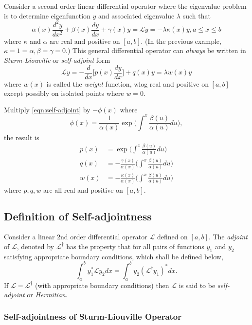 \documentclass[a4paper]{article}
\renewcommand*{\L}{\mathcal{L}}
\begin{document}
Consider a second order linear differential operator where the eigenvalue problem is to determine eigenfunction \(y\) and associated eigenvalue \(\lambda\) such that
\begin{equation}
  \label{eqn:self-adjoint}
\alpha(x) \frac{d^2y}{dx^2} + \beta(x) \frac{dy}{dx} + \gamma(x) y = \L y = -\lambda \kappa(x) y, a \leq x\leq b
\tag{\(\ast\)}
\end{equation}
where \(\kappa\) and \(\alpha\) are real and positive on \([a,b]\). (In the previous example, \(\kappa = 1 = \alpha, \beta=\gamma=0\).) This general differential operator can \emph{always} be written in \emph{Sturm-Liouville} or \emph{self-adjoint} form
\[
\L y = - \frac{d}{dx} \Big[ p(x) \frac{dy}{dx} \Big] + q(x) y =\lambda w(x) y
\]
where \(w(x)\) is called the \emph{weight} function, wlog real and positive on \([a,b]\) except possibly on isolated points where \(w=0\).

Multiply \eqref{eqn:self-adjoint} by \(-\phi(x)\) where
\[
\phi(x) = \frac{1}{\alpha(x)}\exp \Big(\int_{ }^{x} \frac{\beta(u)}{\alpha(u)} du \Big),
\]
the result is
\begin{align*}
  p(x) &= \exp \Big( \int^x \frac{\beta(u)}{\alpha(u)}du \Big) \\
  q(x) &= -\frac{\gamma(x)}{\alpha(x)} \Big( \int^x \frac{\beta(u)}{\alpha(u)}du \Big) \\
  w(x) &= -\frac{\kappa(x)}{\alpha(x)} \Big( \int^x \frac{\beta(u)}{\alpha(u)}du \Big)
\end{align*}
where \(p, q, w\) are all real and positive on \([a,b]\).

\subsection{Definition of Self-adjointness}

Consider a linear \(2\)nd order differential operator \(\L\) defined on \([a,b]\). The \emph{adjoint} of \(\L\), denoted by \(\L^\dag\) has the property that for all pairs of functions \(y_1\) and \(y_2\) satisfying appropriate boundary conditions, which shall be defined below,
\[
\int_a^b y_1^* \L y_2 dx = \int_a^b y_2 (\L^\dag y_1)^* dx.
\]
If \(\L = \L^\dag\) (with appropriate boundary conditions) then \(\L\) is said to be \emph{self-adjoint} or \emph{Hermitian}.

\subsubsection{Self-adjointness of Sturm-Liouville Operator}
\end{document}
